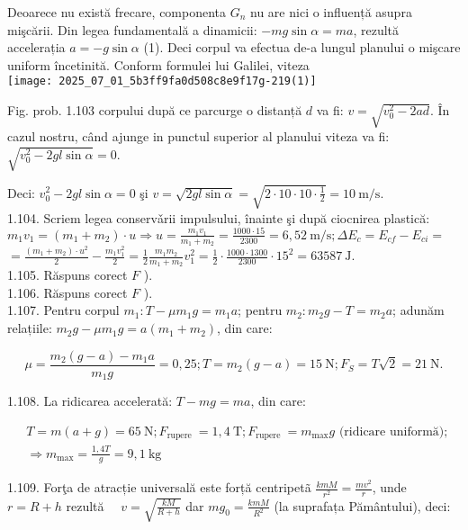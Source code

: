 Deoarece nu există frecare, componenta $G_{n}$ nu are nici o influență asupra mişcării. Din legea fundamentală a dinamicii: $-m g \sin \alpha=m a$, rezultă accelerația $a=-g \sin \alpha$ (1). Deci corpul va efectua de-a lungul planului o mişcare uniform încetinită. Conform formulei lui Galilei, viteza\\
\texttt{[image: 2025\_07\_01\_5b3ff9fa0d508c8e9f17g-219(1)]}

Fig. prob. 1.103 corpului după ce parcurge o distanță $d$ va fi: $v=\sqrt{v_{0}^{2}-2 a d}$. În cazul nostru, când ajunge in punctul superior al planului viteza va fi: $\sqrt{v_{0}^{2}-2 g l \sin \alpha}=0$.

Deci: $v_{0}^{2}-2 g l \sin \alpha=0$ şi $v=\sqrt{2 g l \sin \alpha}=\sqrt{2 \cdot 10 \cdot 10 \cdot \frac{1}{2}}=10 \mathrm{~m} / \mathrm{s}$.\\
1.104. Scriem legea conservǎrii impulsului, înainte şi după ciocnirea plastică:\\
$m_{1} v_{1}=\left(m_{1}+m_{2}\right) \cdot u \Rightarrow u=\frac{m_{1} v_{1}}{m_{1}+m_{2}}=\frac{1000 \cdot 15}{2300}=6,52 \mathrm{~m} / \mathrm{s} ; \Delta E_{c}=E_{c f}-E_{c i}=$\\
$=\frac{\left(m_{1}+m_{2}\right) \cdot u^{2}}{2}-\frac{m_{1} v_{1}^{2}}{2}=\frac{1}{2} \frac{m_{1} m_{2}}{m_{1}+m_{2}} v_{1}^{2}=\frac{1}{2} \cdot \frac{1000 \cdot 1300}{2300} \cdot 15^{2}=63587 \mathrm{~J}$.\\
1.105. Răspuns corect $F$ ).\\
1.106. Răspuns corect $F$ ).\\
1.107. Pentru corpul $m_{1}: T-\mu m_{1} g=m_{1} a$; pentru $m_{2}: m_{2} g-T=m_{2} a$; adunăm relațiile: $m_{2} g-\mu m_{1} g=a\left(m_{1}+m_{2}\right)$, din care:

$$
\mu=\frac{m_{2}(g-a)-m_{1} a}{m_{1} g}=0,25 ; T=m_{2}(g-a)=15 \mathrm{~N} ; F_{S}=T \sqrt{2}=21 \mathrm{~N} .
$$

1.108. La ridicarea accelerată: $T-m g=m a$, din care:

$$
\begin{aligned}
& T=m(a+g)=65 \mathrm{~N} ; F_{\text {rupere }}=1,4 \mathrm{~T} ; F_{\text {rupere }}=m_{\max } g \text { (ridicare uniformă); } \\
& \Rightarrow m_{\max }=\frac{1,4 T}{g}=9,1 \mathrm{~kg}
\end{aligned}
$$

1.109. Forţa de atracție universală este forță centripetã $\frac{k m M}{r^{2}}=\frac{m v^{2}}{r}$, unde $r=R+h$ rezultă $\quad v=\sqrt{\frac{k M}{R+h}}$ dar $m g_{0}=\frac{k m M}{R^{2}}$ (la suprafața Pământului), deci:

